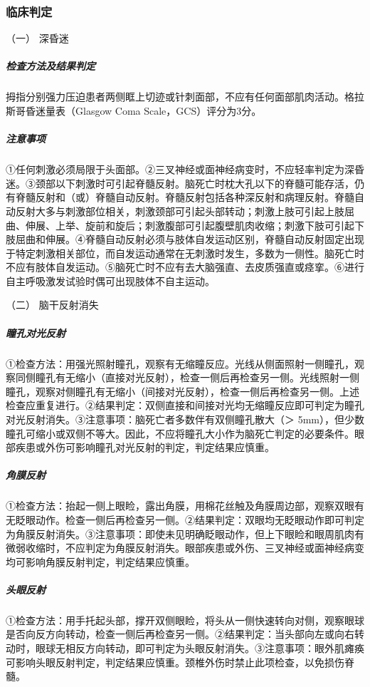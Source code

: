 \subsubsection{临床判定}

\hypertarget{text00069.htmlux5cux23CHP3-1-5-2-1}{}
（一） 深昏迷

\subparagraph{检查方法及结果判定}

拇指分别强力压迫患者两侧眶上切迹或针刺面部，不应有任何面部肌肉活动。格拉斯哥昏迷量表（Glasgow
Coma Scale，GCS）评分为3分。

\subparagraph{注意事项}

①任何刺激必须局限于头面部。②三叉神经或面神经病变时，不应轻率判定为深昏迷。③颈部以下刺激时可引起脊髓反射。脑死亡时枕大孔以下的脊髓可能存活，仍有脊髓反射和（或）脊髓自动反射。脊髓反射包括各种深反射和病理反射。脊髓自动反射大多与刺激部位相关，刺激颈部可引起头部转动；刺激上肢可引起上肢屈曲、伸展、上举、旋前和旋后；刺激腹部可引起腹壁肌肉收缩；刺激下肢可引起下肢屈曲和伸展。④脊髓自动反射必须与肢体自发运动区别，脊髓自动反射固定出现于特定刺激相关部位，而自发运动通常在无刺激时发生，多数为一侧性。脑死亡时不应有肢体自发运动。⑤脑死亡时不应有去大脑强直、去皮质强直或痉挛。⑥进行自主呼吸激发试验时偶可出现肢体不自主运动。

\hypertarget{text00069.htmlux5cux23CHP3-1-5-2-2}{}
（二） 脑干反射消失

\subparagraph{瞳孔对光反射}

①检查方法：用强光照射瞳孔，观察有无缩瞳反应。光线从侧面照射一侧瞳孔，观察同侧瞳孔有无缩小（直接对光反射），检查一侧后再检查另一侧。光线照射一侧瞳孔，观察对侧瞳孔有无缩小（间接对光反射），检查一侧后再检查另一侧。上述检查应重复进行。②结果判定：双侧直接和间接对光均无缩瞳反应即可判定为瞳孔对光反射消失。③注意事项：脑死亡者多数伴有双侧瞳孔散大（＞
5mm），但少数瞳孔可缩小或双侧不等大。因此，不应将瞳孔大小作为脑死亡判定的必要条件。眼部疾患或外伤可影响瞳孔对光反射的判定，判定结果应慎重。

\subparagraph{角膜反射}

①检查方法：抬起一侧上眼睑，露出角膜，用棉花丝触及角膜周边部，观察双眼有无眨眼动作。检查一侧后再检查另一侧。②结果判定：双眼均无眨眼动作即可判定为角膜反射消失。③注意事项：即使未见明确眨眼动作，但上下眼睑和眼周肌肉有微弱收缩时，不应判定为角膜反射消失。眼部疾患或外伤、三叉神经或面神经病变均可影响角膜反射判定，判定结果应慎重。

\subparagraph{头眼反射}

①检查方法：用手托起头部，撑开双侧眼睑，将头从一侧快速转向对侧，观察眼球是否向反方向转动，检查一侧后再检查另一侧。②结果判定：当头部向左或向右转动时，眼球无相反方向转动，即可判定为头眼反射消失。③注意事项：眼外肌瘫痪可影响头眼反射判定，判定结果应慎重。颈椎外伤时禁止此项检查，以免损伤脊髓。

